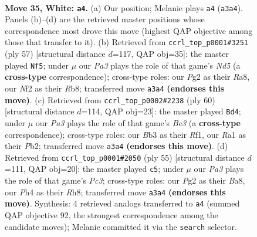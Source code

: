 \documentclass[11pt]{article}
\begin{document}
\clearpage

\begin{figure}[p]\centering
\begin{subfigure}{0.46\textwidth}\centering
\resizebox{\linewidth}{!}{%
\newchessgame
\chessboard[
  setfen={2r2b2/2nkn1pr/6b1/7p/4pP1P/PB4R1/5NP1/R2K2N1 w - - 3 35},
  showmover=false,
  pgfstyle=straightmove, color=movearrow, markmove={a3-a4}
]}
\caption{}
\end{subfigure}\hfill
\begin{subfigure}{0.46\textwidth}\centering
\resizebox{\linewidth}{!}{%
\newchessgame
\chessboard[
  setfen={rr5k/4Bnbp/3pp1p1/p7/2PnN3/7P/P4PP1/1R2RBK1 b - - 5 29},
  showmover=false,
  pgfstyle=straightmove, color=movearrow, markmove={d4-f5}
]}
\caption{}
\end{subfigure}
\\[4pt]
\begin{subfigure}{0.46\textwidth}\centering
\resizebox{\linewidth}{!}{%
\newchessgame
\chessboard[
  setfen={1r1r1bk1/3n2pp/4R3/p2p1N2/4n1P1/4B3/PP2B2P/5R1K w - - 2 31},
  showmover=false,
  pgfstyle=straightmove, color=movearrow, markmove={e3-d4}
]}
\caption{}
\end{subfigure}\hfill
\begin{subfigure}{0.46\textwidth}\centering
\resizebox{\linewidth}{!}{%
\newchessgame
\chessboard[
  setfen={b1r1k2r/p1n2p2/P1p5/6P1/1pBRP2p/8/4KPP1/1N1R4 b k - 0 28},
  showmover=false,
  pgfstyle=straightmove, color=movearrow, markmove={c6-c5}
]}
\caption{}
\end{subfigure}
\caption{\textbf{Move 35, White: \texttt{a4}.} (a) Our position; Melanie plays \texttt{a4} (\texttt{a3a4}). Panels (b)--(d) are the retrieved master positions whose correspondence most drove this move (highest QAP objective among those that transfer to it). (b) Retrieved from \texttt{ccrl\_top\_p0001\#3251} (ply 57) [structural distance $d$=117, QAP obj=35]: the master played \texttt{Nf5}; under $\mu$ our \emph{Pa3} plays the role of that game's \emph{Nd5} (a \textbf{cross-type} correspondence); cross-type roles: our \emph{P}g2 as their \emph{R}a8, our \emph{N}f2 as their \emph{R}b8; transferred move \texttt{a3a4} \textbf{(endorses this move)}. (c) Retrieved from \texttt{ccrl\_top\_p0002\#2238} (ply 60) [structural distance $d$=114, QAP obj=23]: the master played \texttt{Bd4}; under $\mu$ our \emph{Pa3} plays the role of that game's \emph{Be3} (a \textbf{cross-type} correspondence); cross-type roles: our \emph{B}b3 as their \emph{R}f1, our \emph{R}a1 as their \emph{P}b2; transferred move \texttt{a3a4} \textbf{(endorses this move)}. (d) Retrieved from \texttt{ccrl\_top\_p0001\#2050} (ply 55) [structural distance $d$=111, QAP obj=20]: the master played \texttt{c5}; under $\mu$ our \emph{Pa3} plays the role of that game's \emph{Pc3}; cross-type roles: our \emph{P}g2 as their \emph{B}a8, our \emph{P}h4 as their \emph{R}h8; transferred move \texttt{a3a4} \textbf{(endorses this move)}. Synthesis: 4 retrieved analogs transferred to \texttt{a4} (summed QAP objective 92, the strongest correspondence among the candidate moves); Melanie committed it via the \texttt{search} selector.}
\label{fig:thought-m68}
\end{figure}
\end{document}
